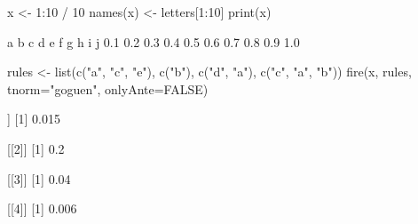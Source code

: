 \begin{Schunk}
% --begin: "fire"
\begin{Sinput}
 x <- 1:10 / 10
 names(x) <- letters[1:10]
 print(x)
\end{Sinput}
\begin{Soutput}
  a   b   c   d   e   f   g   h   i   j 
0.1 0.2 0.3 0.4 0.5 0.6 0.7 0.8 0.9 1.0 
\end{Soutput}
\begin{Sinput}
 rules <- list(c("a", "c", "e"),
               c("b"),
               c("d", "a"),
               c("c", "a", "b"))
 fire(x, rules, tnorm="goguen", onlyAnte=FALSE)
\end{Sinput}
\begin{Soutput}
[[1]]
[1] 0.015

[[2]]
[1] 0.2

[[3]]
[1] 0.04

[[4]]
[1] 0.006
\end{Soutput}
%
% --end: "fire"
\end{Schunk}
